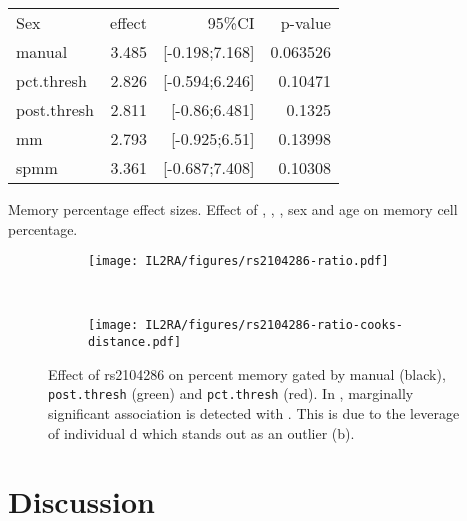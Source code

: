 \begin{table}[h]
\begin{tabular}{lrrr}
\rowcolor{Gray}
Sex              & effect & 95\%CI         & p-value\\
manual           & 3.485  & [-0.198;7.168] & 0.063526\\
pct.thresh       & 2.826  & [-0.594;6.246] & 0.10471\\
post.thresh      & 2.811  & [-0.86;6.481]  & 0.1325\\
mm               & 2.793  & [-0.925;6.51]  & 0.13998\\
spmm             & 3.361  & [-0.687;7.408] & 0.10308\\
\end{tabular} 
{Memory percentage effect sizes.}
{
Effect of , , , sex and age on memory cell percentage.
}
\end{table}


\begin{figure}[h]
\centering
\begin{subfigure}[b]{.4\textwidth}
    \centering
    \texttt{[image: IL2RA/figures/rs2104286-ratio.pdf]}
    \caption{}
\end{subfigure}
~
\begin{subfigure}[b]{.4\textwidth}
    \centering
    \texttt{[image: IL2RA/figures/rs2104286-ratio-cooks-distance.pdf]}
    \caption{}
\end{subfigure}
{Effect of rs2104286 on percent memory gated by manual (black), \texttt{post.thresh} (green) and \texttt{pct.thresh} (red).}
{
  In , marginally significant association is detected with .
  This is due to the leverage of individual d which stands out as an outlier (b).
}
\end{figure}



\clearpage


\section{Discussion}

